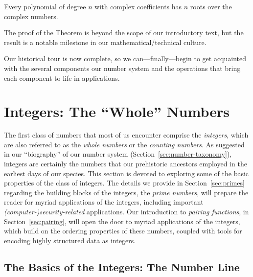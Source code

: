 
\begin{theorem}
Every polynomial of degree $n$ with complex coefficients has $n$ roots over the complex numbers.
\end{theorem}

The proof of the Theorem is beyond the scope of our introductory text, but the result is a notable milestone in our mathematical/technical culture.

\bigskip

Our historical tour is now complete, so we can---finally---begin to get acquainted with the several components our number system and the operations that bring each component to life in applications.

\section{Integers: The ``Whole'' Numbers}
\label{sec:integers}

 

The first class of numbers that most of us encounter comprise the {\it integers}, which are also referred to as the {\it whole numbers} or the {\em counting numbers}.  As suggested in our ``biography'' of our number system (Section~\ref{sec:number-taxonomy}), integers are certainly the numbers that our prehistoric ancestors employed in the earliest days of our species.  This section is devoted to exploring some of the basic properties of the class of integers.  The details we provide in Section~\ref{sec:primes} regarding the building blocks of the integers, the {\it prime numbers}, will prepare the reader for myriad applications of the integers, including important {\em (computer-)security-related} applications.  Our introduction to {\it pairing functions}, in Section~\ref{sec:pairing}, will open the door to myriad applications of the integers, which build on the ordering properties of these numbers, coupled with tools for encoding highly structured data as integers.

\subsection{The Basics of the Integers: The Number Line}
\label{sec:integer-number-line}

